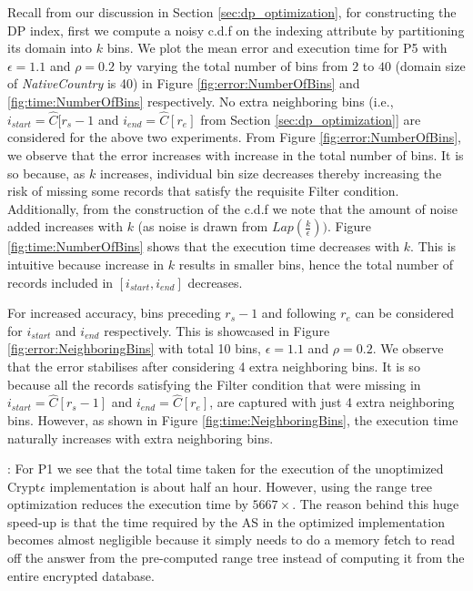 Recall from our discussion in Section \ref{sec:dp_optimization}, for constructing the DP index, first we compute a noisy c.d.f on the indexing attribute by partitioning its domain into $k$ bins. We plot the mean error and execution time for P5 with $\epsilon=1.1$ and $\rho=0.2$ by varying the total number of bins from $2$ to $40$ (domain size of \textit{NativeCountry} is 40) in Figure \ref{fig:error:NumberOfBins} and \ref{fig:time:NumberOfBins} respectively. No extra neighboring bins (i.e., $i_{start}=\hat{C}[r_s-1$ and  $i_{end}=\hat{C}[r_e]$ from Section \ref{sec:dp_optimization}] are considered for the above two experiments. From Figure \ref{fig:error:NumberOfBins}, we observe that the error increases with increase in the total number of bins. It is so because, as $k$ increases, individual bin size decreases thereby increasing the risk of missing some records that satisfy the requisite \textsf{Filter} condition. Additionally, from the construction of the c.d.f we note that the amount of noise added increases with $k$ (as noise is drawn from $Lap(\frac{k}{\epsilon}))$. Figure \ref{fig:time:NumberOfBins} shows that the execution time decreases with $k$. This is intuitive because increase in $k$ results in smaller bins, hence the total number of records included in $[i_{start}, i_{end}]$ decreases.

For increased accuracy,  bins preceding $r_s-1$ and following $r_e$ can be considered for $i_{start}$ and $i_{end}$ respectively. This is showcased in Figure \ref{fig:error:NeighboringBins} with total 10 bins, $\epsilon=1.1$ and $\rho=0.2$. We observe that the error stabilises after considering 4 extra neighboring bins. It is so because all the records satisfying the \textsf{Filter} condition that were missing in $i_{start}=\hat{C}[r_s-1]$ and  $i_{end}=\hat{C}[r_e]$, are captured with just 4 extra neighboring bins. However, as shown in Figure \ref{fig:time:NeighboringBins}, the execution time naturally increases with extra neighboring bins.

:
For P1 we see that the total time taken for the execution of the unoptimized Crypt$\epsilon$ implementation is about half an hour. However, using the range tree optimization reduces the execution time by $5667\times$. The reason behind this huge speed-up is that the time required by the \textsf{AS} in the optimized implementation becomes almost negligible because it simply needs to do a memory fetch to read off the answer from the pre-computed range tree instead of computing it from the entire encrypted database.

